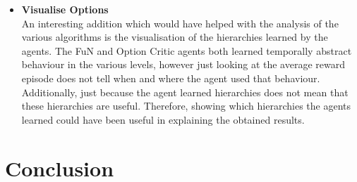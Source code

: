 \documentclass[notitlepage,a4paper,11pt]{article}
\begin{document}
\begin{itemize}
	\item
	\textbf{Visualise Options}\\
	An interesting addition which would have helped with the analysis of the various algorithms is the visualisation of the hierarchies learned by the agents. The FuN and Option Critic agents both learned temporally abstract behaviour in the various levels, however just looking at the average reward episode does not tell when and where the agent used that behaviour. Additionally, just because the agent learned hierarchies does not mean that these hierarchies are useful. Therefore, showing which hierarchies the agents learned could have been useful in explaining the obtained results.
	
	
\end{itemize}


\section{Conclusion}
\end{document}

